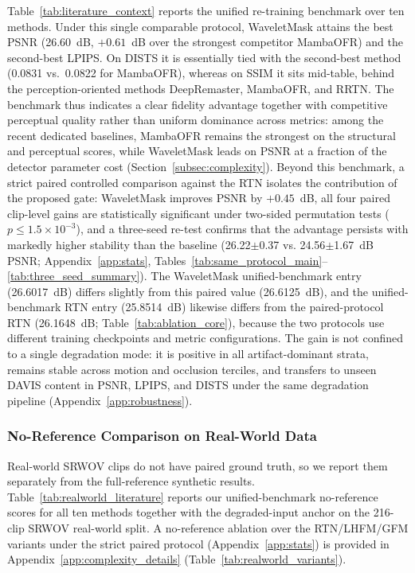Table~\ref{tab:literature_context} reports the unified re-training benchmark over ten methods. Under this single comparable protocol, WaveletMask attains the best PSNR (26.60~dB, $+0.61$~dB over the strongest competitor MambaOFR) and the second-best LPIPS. On DISTS it is essentially tied with the second-best method (0.0831 vs.\ 0.0822 for MambaOFR), whereas on SSIM it sits mid-table, behind the perception-oriented methods DeepRemaster, MambaOFR, and RRTN. The benchmark thus indicates a clear fidelity advantage together with competitive perceptual quality rather than uniform dominance across metrics: among the recent dedicated baselines, MambaOFR remains the strongest on the structural and perceptual scores, while WaveletMask leads on PSNR at a fraction of the detector parameter cost (Section~\ref{subsec:complexity}). Beyond this benchmark, a strict paired controlled comparison against the RTN isolates the contribution of the proposed gate: WaveletMask improves PSNR by $+0.45$~dB, all four paired clip-level gains are statistically significant under two-sided permutation tests ($p\le1.5\times10^{-3}$), and a three-seed re-test confirms that the advantage persists with markedly higher stability than the baseline (26.22$\pm$0.37 vs. 24.56$\pm$1.67~dB PSNR; Appendix~\ref{app:stats}, Tables~\ref{tab:same_protocol_main}--\ref{tab:three_seed_summary}). The WaveletMask unified-benchmark entry (26.6017~dB) differs slightly from this paired value (26.6125~dB), and the unified-benchmark RTN entry (25.8514~dB) likewise differs from the paired-protocol RTN (26.1648~dB; Table~\ref{tab:ablation_core}), because the two protocols use different training checkpoints and metric configurations. The gain is not confined to a single degradation mode: it is positive in all artifact-dominant strata, remains stable across motion and occlusion terciles, and transfers to unseen DAVIS content in PSNR, LPIPS, and DISTS under the same degradation pipeline (Appendix~\ref{app:robustness}).

\subsubsection{No-Reference Comparison on Real-World Data}\label{subsec:realworld}

Real-world SRWOV clips do not have paired ground truth, so we report them separately from the full-reference synthetic results. Table~\ref{tab:realworld_literature} reports our unified-benchmark no-reference scores for all ten methods together with the degraded-input anchor on the 216-clip SRWOV real-world split. A no-reference ablation over the RTN/LHFM/GFM variants under the strict paired protocol (Appendix~\ref{app:stats}) is provided in Appendix~\ref{app:complexity_details} (Table~\ref{tab:realworld_variants}).

